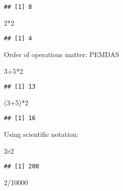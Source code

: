 \documentclass[
]{article}
\newenvironment{Shaded}{\begin{snugshade}}{\end{snugshade}}
\newcommand{\DecValTok}[1]{\textcolor[rgb]{0.00,0.00,0.81}{#1}}
\newcommand{\FloatTok}[1]{\textcolor[rgb]{0.00,0.00,0.81}{#1}}
\newcommand{\NormalTok}[1]{#1}
\newcommand{\SpecialCharTok}[1]{\textcolor[rgb]{0.00,0.00,0.00}{#1}}
\begin{document}
\begin{verbatim}
## [1] 8
\end{verbatim}

\begin{Shaded}
\begin{Highlighting}[]
\DecValTok{2}\SpecialCharTok{*}\DecValTok{2}
\end{Highlighting}
\end{Shaded}

\begin{verbatim}
## [1] 4
\end{verbatim}

Order of operations matter: PEMDAS

\begin{Shaded}
\begin{Highlighting}[]
\DecValTok{3}\SpecialCharTok{+}\DecValTok{5}\SpecialCharTok{*}\DecValTok{2}
\end{Highlighting}
\end{Shaded}

\begin{verbatim}
## [1] 13
\end{verbatim}

\begin{Shaded}
\begin{Highlighting}[]
\NormalTok{(}\DecValTok{3}\SpecialCharTok{+}\DecValTok{5}\NormalTok{)}\SpecialCharTok{*}\DecValTok{2}
\end{Highlighting}
\end{Shaded}

\begin{verbatim}
## [1] 16
\end{verbatim}

Using scientific notation:

\begin{Shaded}
\begin{Highlighting}[]
\FloatTok{2e2}
\end{Highlighting}
\end{Shaded}

\begin{verbatim}
## [1] 200
\end{verbatim}

\begin{Shaded}
\begin{Highlighting}[]
\DecValTok{2}\SpecialCharTok{/}\DecValTok{10000}
\end{Highlighting}
\end{Shaded}
\end{document}
